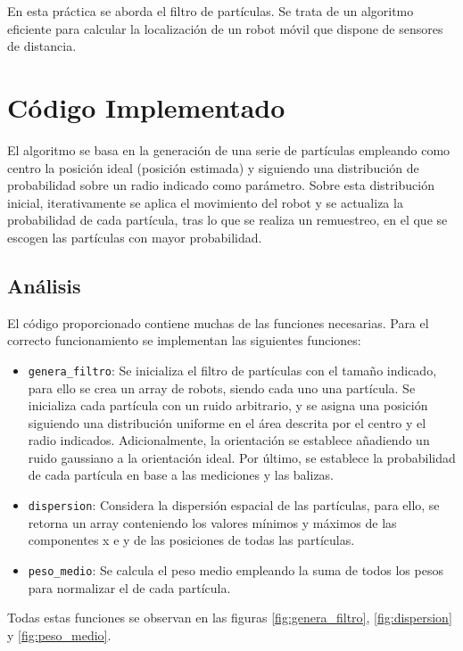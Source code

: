 En esta práctica se aborda el filtro de partículas. Se trata de un algoritmo eficiente para calcular la localización de un robot móvil que dispone de sensores de distancia.

\section{Código Implementado}
El algoritmo se basa en la generación de una serie de partículas empleando como centro la posición ideal (posición estimada) y siguiendo una distribución de probabilidad
sobre un radio indicado como parámetro. Sobre esta distribución inicial, iterativamente se aplica el movimiento del robot y se actualiza la probabilidad de cada partícula, 
tras lo que se realiza un remuestreo, en el que se escogen las partículas con mayor probabilidad.


\subsection{Análisis}
El código proporcionado contiene muchas de las funciones necesarias. Para el correcto funcionamiento se implementan las siguientes funciones:
\begin{itemize}
  \item \texttt{genera\_filtro}: Se inicializa el filtro de partículas con el tamaño indicado, para ello se crea un array de robots, siendo
cada uno una partícula. Se inicializa cada partícula con un ruido arbitrario, y se asigna una posición siguiendo una distribución uniforme en el área
descrita por el centro y el radio indicados. Adicionalmente, la orientación se establece añadiendo un ruido gaussiano a la orientación ideal. Por último,
se establece la probabilidad de cada partícula en base a las mediciones y las balizas.
  \item \texttt{dispersion}: Considera la dispersión espacial de las partículas, para ello, se retorna un array conteniendo los valores mínimos y máximos de las componentes x e y de las posiciones de todas las partículas.
  \item \texttt{peso\_medio}: Se calcula el peso medio empleando la suma de todos los pesos para normalizar el de cada partícula.
\end{itemize}
Todas estas funciones se observan en las figuras \ref{fig:genera_filtro}, \ref{fig:dispersion} y \ref{fig:peso_medio}.

